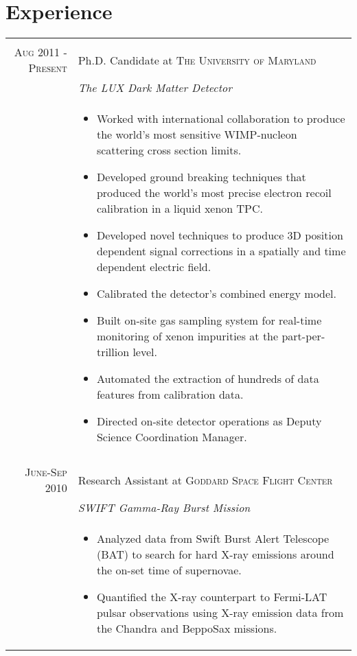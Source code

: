 \documentclass[a4paper,10pt]{article}
\begin{document}
\section{Experience}
\begin{tabular}{r|p{11cm}}
 \multicolumn{2}{c}{} \\
 \textsc{Aug 2011 - Present} & Ph.D. Candidate at \textsc{The University of Maryland} \\&\emph{The LUX Dark Matter Detector}\\&\footnotesize{
 \begin{itemize}
 
 \item Worked with international collaboration to produce the world's most sensitive WIMP-nucleon scattering cross section limits.  
  
\item  Developed ground breaking techniques that produced the world's most precise electron recoil calibration in a liquid xenon TPC.  

\item Developed novel techniques to produce 3D position dependent signal corrections in a spatially and time dependent electric field.  

\item Calibrated the detector's combined energy model.

\item Built on-site gas sampling system for real-time monitoring of xenon impurities at the part-per-trillion level.

\item Automated the extraction of hundreds of data features from calibration data.  

\item Directed on-site detector operations as Deputy Science Coordination Manager.

\end{itemize}
}\\ 
 \multicolumn{2}{c}{} \\
 \textsc{June-Sep 2010} & Research Assistant at \textsc{Goddard Space Flight Center} \\&\emph{SWIFT Gamma-Ray Burst Mission}\\&\footnotesize{
 \begin{itemize}
\item Analyzed data from Swift Burst Alert Telescope (BAT) to search for hard X-ray emissions around the on-set time of supernovae.
\item Quantified the X-ray counterpart to Fermi-LAT pulsar observations using X-ray emission data from the Chandra and BeppoSax missions.
\end{itemize}
 
}
\end{tabular}
\end{document}
